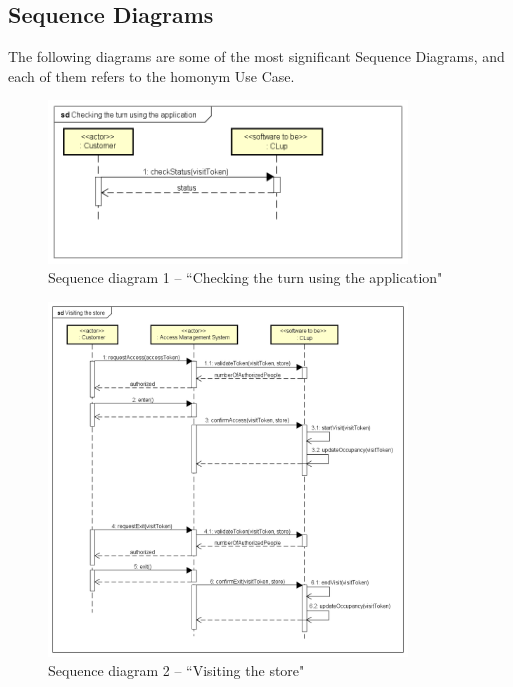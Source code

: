 \documentclass[a4paper,oneside,11pt]{book}   %
\begin{document}
    \subsection{Sequence Diagrams}
    The following diagrams are some of the most significant Sequence Diagrams, and each of them refers to the homonym Use Case. 
    
    \begin{figure}[H]
        \centering
        \includegraphics[width=0.85\textwidth, keepaspectratio]{pictures/sequence_diagrams/check_turn_via_app}
        \caption{Sequence diagram 1 -- ``Checking the turn using the application"}
        \label{figure:sequence_diagram_1_check_turn_via_app}
    \end{figure}
    
    \begin{figure}[H]
        \centering
        \includegraphics[width=0.85\textwidth, keepaspectratio]{pictures/sequence_diagrams/visiting_the_store}
        \caption{Sequence diagram 2 -- ``Visiting the store"}
        \label{figure:sequence_diagram_2_visiting_store_app}
    \end{figure}
    
\end{document}
